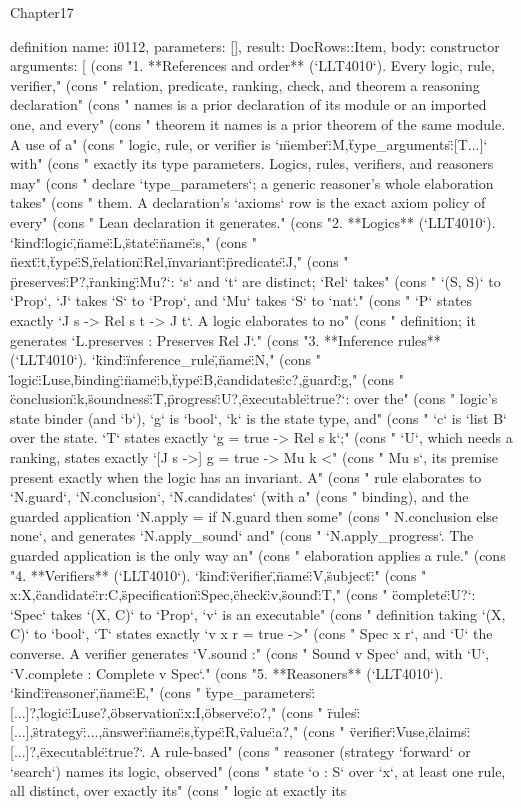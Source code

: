 \begin{lexlean}{Chapter17}
\begin{semanticmodule}
definition{
  name: i0112,
  parameters: [],
  result: DocRows::Item,
  body: constructor{
    arguments: [
      (cons "1. **References and order** (`LLT4010`). Every logic, rule, verifier," (cons "   relation, predicate, ranking, check, and theorem a reasoning declaration" (cons "   names is a prior declaration of its module or an imported one, and every" (cons "   theorem it names is a prior theorem of the same module. A use of a" (cons "   logic, rule, or verifier is `{\"member\":M,\"type_arguments\":[T...]}` with" (cons "   exactly its type parameters. Logics, rules, verifiers, and reasoners may" (cons "   declare `type_parameters`; a generic reasoner's whole elaboration takes" (cons "   them. A declaration's `axioms` row is the exact axiom policy of every" (cons "   Lean declaration it generates." (cons "2. **Logics** (`LLT4010`). `{\"kind\":\"logic\",\"name\":L,\"state\":{\"name\":s," (cons "   \"next\":t,\"type\":S},\"relation\":Rel,\"invariant\":{\"predicate\":J," (cons "   \"preserves\":P}?,\"ranking\":Mu?}`: `s` and `t` are distinct; `Rel` takes" (cons "   `(S, S)` to `Prop`, `J` takes `S` to `Prop`, and `Mu` takes `S` to `nat`." (cons "   `P` states exactly `J s -> Rel s t -> J t`. A logic elaborates to no" (cons "   definition; it generates `L.preserves : Preserves Rel J`." (cons "3. **Inference rules** (`LLT4010`). `{\"kind\":\"inference_rule\",\"name\":N," (cons "   \"logic\":Luse,\"binding\":{\"name\":b,\"type\":B,\"candidates\":c}?,\"guard\":g," (cons "   \"conclusion\":k,\"soundness\":T,\"progress\":U?,\"executable\":true?}`: over the" (cons "   logic's state binder (and `b`), `g` is `bool`, `k` is the state type, and" (cons "   `c` is `list B` over the state. `T` states exactly `g = true -> Rel s k`;" (cons "   `U`, which needs a ranking, states exactly `[J s ->] g = true -> Mu k <" (cons "   Mu s`, its premise present exactly when the logic has an invariant. A" (cons "   rule elaborates to `N.guard`, `N.conclusion`, `N.candidates` (with a" (cons "   binding), and the guarded application `N.apply = if N.guard then some" (cons "   N.conclusion else none`, and generates `N.apply_sound` and" (cons "   `N.apply_progress`. The guarded application is the only way an" (cons "   elaboration applies a rule." (cons "4. **Verifiers** (`LLT4010`). `{\"kind\":\"verifier\",\"name\":V,\"subject\":" (cons "   {x:X},\"candidate\":{r:C},\"specification\":Spec,\"check\":v,\"sound\":T," (cons "   \"complete\":U?}`: `Spec` takes `(X, C)` to `Prop`, `v` is an executable" (cons "   definition taking `(X, C)` to `bool`, `T` states exactly `v x r = true ->" (cons "   Spec x r`, and `U` the converse. A verifier generates `V.sound :" (cons "   Sound v Spec` and, with `U`, `V.complete : Complete v Spec`." (cons "5. **Reasoners** (`LLT4010`). `{\"kind\":\"reasoner\",\"name\":E," (cons "   \"type_parameters\":[...]?,\"logic\":Luse?,\"observation\":{x:I},\"observe\":o?," (cons "   \"rules\":[...],\"strategy\":...,\"answer\":{\"name\":s,\"type\":R,\"value\":a}?," (cons "   \"verifier\":Vuse,\"claims\":[...]?,\"executable\":true?}`. A rule-based" (cons "   reasoner (strategy `forward` or `search`) names its logic, observed" (cons "   state `o : S` over `x`, at least one rule, all distinct, over exactly its" (cons "   logic at exactly its }}
\end{semanticmodule}
\end{lexlean}
